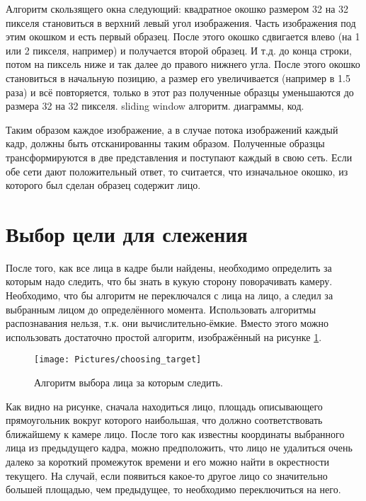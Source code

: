 \documentclass[12pt]{report}
\begin{document}
Алгоритм скользящего окна следующий: квадратное окошко размером 32 на 32 пикселя становиться в верхний левый угол 
изображения. Часть изображения под этим окошком и есть первый образец. После этого окошко сдвигается влево (на 1 
или 
2 пикселя, например) и получается второй образец. И т.д. до конца строки, потом на пиксель ниже и так далее до 
правого нижнего угла. После этого окошко становиться в начальную позицию, а размер его увеличивается (например в 
1.5 
раза) и всё повторяется, только в этот раз полученные образцы уменьшаются до размера 32 на 32 пикселя.
sliding window алгоритм. диаграммы, код.

Таким образом каждое изображение, а в случае потока изображений каждый кадр, должны быть отсканированны таким 
образом. 
Полученные образцы трансформируются в две представления и поступают каждый в свою сеть. Если обе сети дают 
положительный ответ, то считается, что изначальное окошко, из которого был сделан образец содержит лицо.

\section{Выбор цели для слежения}
После того, как все лица в кадре были найдены, необходимо определить за которым надо следить, что бы знать в кукую 
сторону поворачивать камеру. Необходимо, что бы алгоритм не переключался с лица на лицо, а следил за выбранным 
лицом 
до определённого момента. Использовать алгоритмы распознавания нельзя, т.к. они вычислительно-ёмкие. Вместо этого 
можно использовать достаточно простой алгоритм, изображённый на рисунке \ref{fig:choosing_face}.

\begin{figure}[h]
	\centering
	\texttt{[image: Pictures/choosing\_target]}	
	\caption{Алгоритм выбора лица за которым следить.}
	\label{fig:choosing_face}
\end{figure}

Как видно на рисунке, сначала находиться лицо, площадь описывающего прямоугольник вокруг которого наибольшая, что 
должно соответствовать ближайшему к камере лицо. После того как известны координаты выбранного лица из предыдущего 
кадра, можно предположить, что лицо не удалиться очень далеко за короткий промежуток времени и его можно найти в 
окрестности текущего. На случай, если появиться какое-то другое лицо со значительно большей площадью, чем 
предыдущее, 
то необходимо переключиться на него. 
\end{document}
